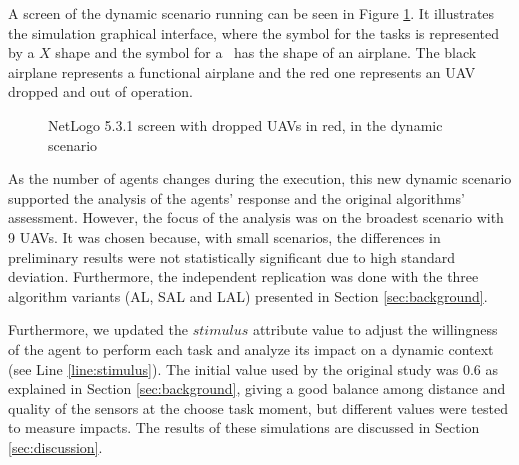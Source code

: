 A screen of the dynamic scenario running can be seen in Figure \ref{fig:screen01}. It illustrates the simulation graphical interface, where the symbol for the tasks is represented by a $X$ shape and the symbol for a \uav\ has the shape of an airplane. The black airplane represents a functional airplane and the red one represents an UAV dropped and out of operation.

\begin{figure}[h!]
	\begin{center}
		\caption{NetLogo 5.3.1 screen with dropped UAVs in red, in the dynamic scenario}
		\label{fig:screen01}
	\end{center}
\end{figure}

As the number of agents changes during the execution, this new dynamic scenario supported the analysis of the agents' response and the original algorithms' assessment. However, the focus of the analysis was on the broadest scenario with 9 UAVs. It was chosen because, with small scenarios, the differences in preliminary results were not statistically significant due to high standard deviation. Furthermore, the independent replication was done with the three algorithm variants (AL, SAL and LAL) presented in Section \ref{sec:background}.

Furthermore, we updated the $stimulus$ attribute value to adjust the willingness of the agent to perform each task and analyze its impact on a dynamic context (see Line \ref{line:stimulus}). The initial value used by the original study was $0.6$ as explained in Section \ref{sec:background}, giving a good balance among distance and quality of the sensors at the choose task moment, but different values were tested to measure impacts. The results of these simulations are discussed in Section \ref{sec:discussion}. 